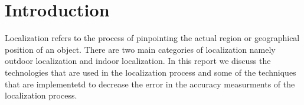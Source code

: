 \chapter{Introduction}
Localization refers to the process of pinpointing the actual region or geographical position of an object. There are two main categories of localization namely outdoor localization and indoor localization. In this report we discuss the technologies that are used in the localization process and some of the techniques that are implementetd to decrease the error in the accuracy measurments of the localization process.
